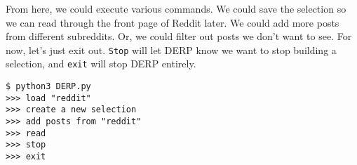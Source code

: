From here, we could execute various commands. We could save the selection so we can read through the front page of Reddit later. We could add more posts from different subreddits. Or, we could filter out posts we don’t want to see. For now, let’s just exit out. \texttt{Stop} will let DERP know we want to stop building a selection, and \texttt{exit} will stop DERP entirely.
\begin{lstlisting}
$ python3 DERP.py
>>> load "reddit"
>>> create a new selection
>>> add posts from "reddit"
>>> read
>>> stop
>>> exit
\end{lstlisting}
